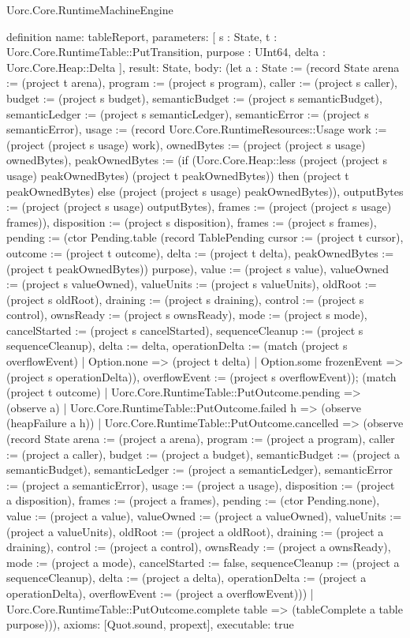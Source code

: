 \begin{lexlean}{Uorc.Core.RuntimeMachineEngine}
\begin{semanticmodule}
definition{
  name: tableReport,
  parameters: [
    s : State,
    t : Uorc.Core.RuntimeTable::PutTransition,
    purpose : UInt64,
    delta : Uorc.Core.Heap::Delta
  ],
  result: State,
  body: (let a : State := (record State {arena := (project t arena), program := (project s program), caller := (project s caller), budget := (project s budget), semanticBudget := (project s semanticBudget), semanticLedger := (project s semanticLedger), semanticError := (project s semanticError), usage := (record Uorc.Core.RuntimeResources::Usage {work := (project (project s usage) work), ownedBytes := (project (project s usage) ownedBytes), peakOwnedBytes := (if (Uorc.Core.Heap::less (project (project s usage) peakOwnedBytes) (project t peakOwnedBytes)) then (project t peakOwnedBytes) else (project (project s usage) peakOwnedBytes)), outputBytes := (project (project s usage) outputBytes), frames := (project (project s usage) frames)}), disposition := (project s disposition), frames := (project s frames), pending := (ctor Pending.table (record TablePending {cursor := (project t cursor), outcome := (project t outcome), delta := (project t delta), peakOwnedBytes := (project t peakOwnedBytes)}) purpose), value := (project s value), valueOwned := (project s valueOwned), valueUnits := (project s valueUnits), oldRoot := (project s oldRoot), draining := (project s draining), control := (project s control), ownsReady := (project s ownsReady), mode := (project s mode), cancelStarted := (project s cancelStarted), sequenceCleanup := (project s sequenceCleanup), delta := delta, operationDelta := (match (project s overflowEvent)
    | Option.none => (project t delta)
    | Option.some frozenEvent => (project s operationDelta)), overflowEvent := (project s overflowEvent)}); (match (project t outcome)
    | Uorc.Core.RuntimeTable::PutOutcome.pending => (observe a)
    | Uorc.Core.RuntimeTable::PutOutcome.failed h => (observe (heapFailure a h))
    | Uorc.Core.RuntimeTable::PutOutcome.cancelled => (observe (record State {arena := (project a arena), program := (project a program), caller := (project a caller), budget := (project a budget), semanticBudget := (project a semanticBudget), semanticLedger := (project a semanticLedger), semanticError := (project a semanticError), usage := (project a usage), disposition := (project a disposition), frames := (project a frames), pending := (ctor Pending.none), value := (project a value), valueOwned := (project a valueOwned), valueUnits := (project a valueUnits), oldRoot := (project a oldRoot), draining := (project a draining), control := (project a control), ownsReady := (project a ownsReady), mode := (project a mode), cancelStarted := false, sequenceCleanup := (project a sequenceCleanup), delta := (project a delta), operationDelta := (project a operationDelta), overflowEvent := (project a overflowEvent)}))
    | Uorc.Core.RuntimeTable::PutOutcome.complete table => (tableComplete a table purpose))),
  axioms: [Quot.sound, propext],
  executable: true
}


\end{semanticmodule}
\end{lexlean}
